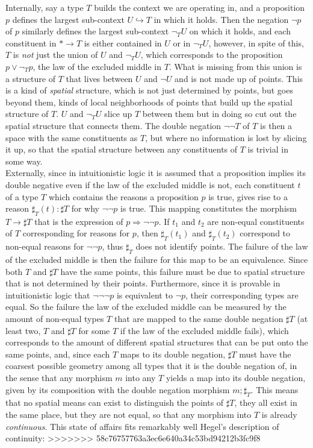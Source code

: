 \documentclass{article}
\begin{document}
Internally, say a type $T$ builds the context we are operating in, and a proposition $p$ defines the largest
sub-context $U\hookrightarrow T$ in which it holds. Then the negation $\neg p$ of $p$ similarly defines
the largest sub-context $\neg_T U$ on which it holds, and each constituent in $*\rightarrow T$ is either
contained in $U$ or in $\neg_T U$, however, in spite of this, $T$ is \emph{not} just the union of $U$
and $\neg_T U$, which corresponds to the proposition $p\vee \neg_T p$, the law of the excluded middle
in $T$. What is missing from this union is a structure of $T$ that lives between $U$ and $\neg U$ and
is not made up of points. This is a kind of \emph{spatial} structure, which is not just determined by
points, but goes beyond them, kinds of local neighborhoods of points that build up the spatial structure
of $T$. $U$ and $\neg_T U$ slice up $T$ between them but in doing so cut out the spatial structure that
connects them. The double negation $\neg\neg T$ of $T$ is then a space with the same constituents as $T$,
but where no information is lost by slicing it up, so that the spatial structure between any constituents
of $T$ is trivial in some way. \\

Externally, since in intuitionistic logic it is assumed that a proposition implies its double negative
even if the law of the excluded middle is not, each constituent $t$ of a type $T$ which contains the reasons
a proposition $p$ is true, gives rise to a reason $\sharp_T (t):\sharp T$ for why $\neg\neg p$ is true.
This mapping constitutes the morphism $T \rightarrow \sharp T$ that is the expression of $p\Rightarrow\neg\neg
p$. If $t_1$ and $t_2$ are non-equal constituents of $T$ corresponding for reasons for $p$, then $\sharp_T
(t_1)$ and $\sharp_T (t_2)$ correspond to non-equal reasons for $\neg\neg p$, thus $\sharp_T$ does not
identify points. The failure of the law of the excluded middle is then the failure for this map to be
an equivalence. Since both $T$ and $\sharp T$ have the same points, this failure must be due to spatial
structure that is not determined by their points. Furthermore, since it is provable in intuitionistic
logic that $\neg\neg\neg p$ is equivalent to $\neg p$, their corresponding types are equal. So the failure
the law of the excluded middle can be measured by the amount of non-equal types $T$ that are mapped to
the same double negation $\sharp T$ (at least two, $T$ and $\sharp T$ for some $T$ if the law of the excluded
middle fails), which corresponds to the amount of different spatial structures that can be put onto the
same points, and, since each $T$ maps to its double negation, $\sharp T$ must have the coarsest possible
geometry among all types that it is the double negation of, in the sense that any morphism $m$ into any
$T$ yields a map into its double negation, given by its composition with the double negation morphism
$m;\sharp_T$. This means that no spatial means can exist to distinguish the points of $\sharp T$, they
all exist in the same place, but they are not equal, so that any morphism into $T$ is already \emph{continuous}.
This state of affairs fits remarkably well Hegel's description of continuity:
>>>>>>> 58c76757763a3ec6e640a34c53bd94212b3fc9f8
\end{document}
